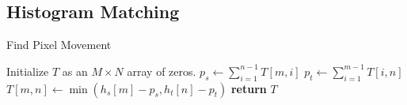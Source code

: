 %


\subsection{Histogram Matching}
%  
{ \footnotesize
\begin{algorithm}
 \caption{Find Pixel Movement} 
 \label{alg:ehm}
 \begin{algorithmic}
	\footnotesize
    \State Initialize $T$ as an $M \times N$ array of zeros.
        \State $p_s \gets \sum_{i=1}^{n-1} T[m, i]$
        \State $p_t \gets \sum_{i=1}^{m-1} T[i, n]$
        \State $T[m, n] \gets \min(h_s[m] - p_s, h_t[n] - p_t)$
      \EndFor
    \EndFor
    \State \textbf{return} $T$
  \EndProcedure
 \end{algorithmic}
\end{algorithm}
}

